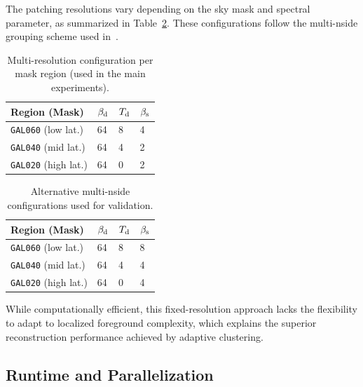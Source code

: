 \documentclass[fleqn,usenatbib]{mnras}
\begin{document}
The patching resolutions vary depending on the sky mask and spectral parameter, as summarized in Table~\ref{tab:multires_config}. These configurations follow the multi-nside grouping scheme used in~\citep{LiteBIRD_PTEP_2022}.

\begin{table}
    \centering
    \small
    \caption{Multi-resolution configuration per mask region (used in the main experiments).}
    \begin{tabular}{@{}p{3.5cm}|p{1.5cm}@{}|p{1.5cm}@{}|p{1.5cm}@{}}
        \toprule
        \textbf{Region (Mask)} & \( \beta_{\rm d} \) & \( T_{\rm d} \) & \( \beta_{\rm s} \) \\
        \midrule
        \texttt{GAL060} (low lat.)  & 64 & 8 & 4 \\
        \texttt{GAL040} (mid lat.)  & 64 & 4 & 2 \\
        \texttt{GAL020} (high lat.) & 64 & 0 & 2 \\
        \bottomrule
    \end{tabular}
    \label{tab:multires_config}
\end{table}

\begin{table}
    \centering
    \small
    \caption{Alternative multi-nside configurations used for validation.}
    \begin{tabular}{@{}p{3.5cm}|p{1.5cm}@{}|p{1.5cm}@{}|p{1.5cm}@{}}
        \toprule
        \textbf{Region (Mask)} & \( \beta_{\rm d} \) & \( T_{\rm d} \) & \( \beta_{\rm s} \) \\
        \midrule
        \texttt{GAL060} (low lat.)  & 64 & 8 & 8 \\
        \texttt{GAL040} (mid lat.)  & 64 & 4 & 4 \\
        \texttt{GAL020} (high lat.) & 64 & 0 & 4 \\
        \bottomrule
    \end{tabular}
    \label{tab:multires_config}
\end{table}

While computationally efficient, this fixed-resolution approach lacks the flexibility to adapt to localized foreground complexity, which explains the superior reconstruction performance achieved by adaptive clustering.

\subsection{Runtime and Parallelization}
\label{subsec:runtime}
\end{document}
